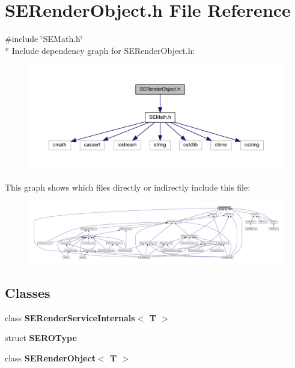 \section{S\+E\+Render\+Object.\+h File Reference}
\label{_s_e_render_object_8h}
{\ttfamily \#include \char`\"{}S\+E\+Math.\+h\char`\"{}}\\*
Include dependency graph for S\+E\+Render\+Object.\+h\+:
\nopagebreak
\begin{figure}[H]
\begin{center}
\leavevmode
\includegraphics[width=350pt]{_s_e_render_object_8h__incl}
\end{center}
\end{figure}
This graph shows which files directly or indirectly include this file\+:
\nopagebreak
\begin{figure}[H]
\begin{center}
\leavevmode
\includegraphics[width=350pt]{_s_e_render_object_8h__dep__incl}
\end{center}
\end{figure}
\subsection*{Classes}
\begin{DoxyCompactItemize}
\item 
class {\bf S\+E\+Render\+Service\+Internals$<$ T $>$}
\item 
struct {\bf S\+E\+R\+O\+Type}
\item 
class {\bf S\+E\+Render\+Object$<$ T $>$}
\end{DoxyCompactItemize}

